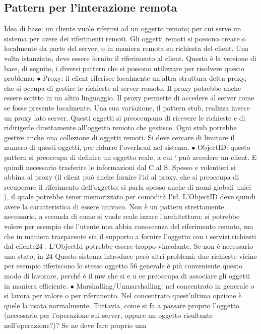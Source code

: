 \subsection{Pattern per l'interazione remota}
Idea di base: un cliente vuole riferirsi ad un oggetto remoto; per cui serve un
sistema per avere dei riferimenti remoti. Gli oggetti remoti si possono creare o
localmente da parte del server, o in maniera remota su richiesta del client. Una
volta istanziato, deve essere fornito il riferimento al client. Questa è la versione
di base, di seguito, i diversi pattern che si possono utilizzare per risolvere questo
problema:
$\bullet$ Proxy: il client riferisce localmente un'altra struttura detta proxy, che si
occupa di gestire le richieste al server remoto. Il proxy potrebbe anche
essere scritto in un altro linguaggio. Il proxy permette di accedere al server
come se fosse presente localmente.
Una sua variazione, il pattern stub, realizza invece un proxy lato server.
Questi oggetti si preoccupano di ricevere le richieste e di ridirigerle direttamente all'oggetto remoto che gestisce.
Ogni stub potrebbe gestire anche
una collezione di oggetti remoti.
Si deve cercare di limitare il numero di questi oggetti, per ridurre l'overhead nel sistema.
$\bullet$ ObjectID: questo pattern si preoccupa di definire un oggetto reale, a cui
`
può accedere un client. E quindi necessario trasferire le informazioni dal C
al S. Spesso e volentieri si abbina al proxy (il client può anche fornire l'id
al proxy, che si preoccupa di recuperare il riferimento dell'oggetto: si parla
spesso anche di nomi globali unici ), il quale potrebbe tener memorizzato
per comodità l'id. L'ObjectID deve quindi avere la caratteristica di essere
univoco.
Non è un pattern strettamente necessario, a seconda di come si vuole reale
izzare l'architettura: si potrebbe volere per esempio che l'utente non abbia
conoscenza del riferimento remoto, ma che in maniera trasparente sia il
supporto a fornire l'oggetto con i servizi richiesti dal cliente24 . L'ObjectId potrebbe essere troppo vincolante. Se
non è necessario uno stato, in
24 Questo sistema introduce però altri problemi: due richieste vicine per esempio riferiscono
lo stesso oggetto
56
generale è più conveniente questo modo di lavorare, perché è il mw che si
e u
ee
preoccupa di associare gli oggetti in maniera efficiente.
$\bullet$ Marshalling/Unmarshalling: nel concentrato in generale o si lavora per
valore o per riferimento. Nel concentrato quest'ultima opzione è quele
la usata normalmente. Tuttavia, come si fa a passare proprio l'oggetto
(necessario per l'operazione sul server, oppure un oggetto risultante nell'operazione?)? Se ne deve fare proprio una
